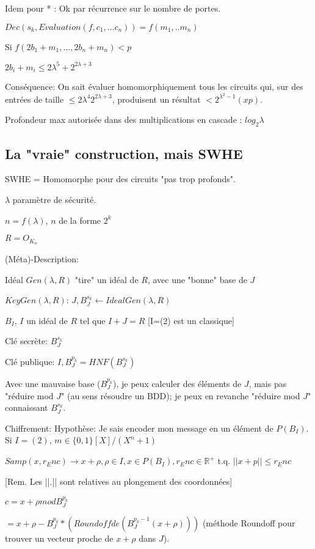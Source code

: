 Idem pour * : Ok par récurrence sur le nombre de portes.

$Dec(s_k,Evaluation(f,c_1,...c_n))=f(m_1,..m_n)$

Si $f(2 b_1+m_1,...,2 b_n+m_n)<p$

$2 b_i + m_i \leq 2 \lambda^5 + 2^{2 \lambda+3}$

Conséquence: On sait évaluer homomorphiquement tous les circuits qui, sur des entrées de taille $\leq 2 \lambda^4 2^{2 \lambda +3}$, produisent un résultat $< 2^{\lambda^2 -1} (x p)$.

Profondeur max autorisée dans des multiplications en cascade : $log_2 \lambda$

\subsection{La "vraie" construction, mais SWHE}

SWHE = Homomorphe pour des circuits "pas trop profonds".

$\lambda$ paramètre de sécurité.

$n=f(\lambda)$, $n$ de la forme $2^k$

$R=O_{K_n}$

(Méta)-Description:

Idéal $Gen(\lambda,R)$ "tire" un idéal de $R$, avec une "bonne" base de $J$

$KeyGen(\lambda,R)$: $J,B_J^{s_k} \leftarrow IdealGen(\lambda,R)$

$B_I$, $I$ un idéal de $R$ tel que $I+J=R$ [I=(2) est un classique]

Clé secrète: $B_J^{s_k}$

Clé publique: $I, B_J^{p_k}=HNF(B_J^{s_k})$

Avec une mauvaise base ($B_J^{p_k}$), je peux calculer des éléments de $J$, mais pas "réduire mod $J$" (au sens résoudre un BDD); je peux en revanche "réduire mod $J$" connaissant $B_J^{s_k}$.

Chiffrement: 
Hypothèse: Je sais encoder mon message en un élément de $P(B_I)$.
Si $I=(2)$, $m \in \{0,1\}[X]/(X^n+1)$

$Samp(x,r_Enc) \rightarrow x+ \rho, \rho \in I, x \in P(B_I), r_Enc \in \mathbb{R}^+$ t.q. $||x+p|| \leq r_Enc$

[Rem. Les ||.|| sont relatives au plongement des coordonnées]

$c=x+\rho mod B_J^{p_k}$

$=x+ \rho - B_J^{p_k} *(Roundoff de (B_J^{p_k-1}(x+ \rho)))$ (méthode Roundoff pour trouver un vecteur proche de $x + \rho$ dans $J$).

